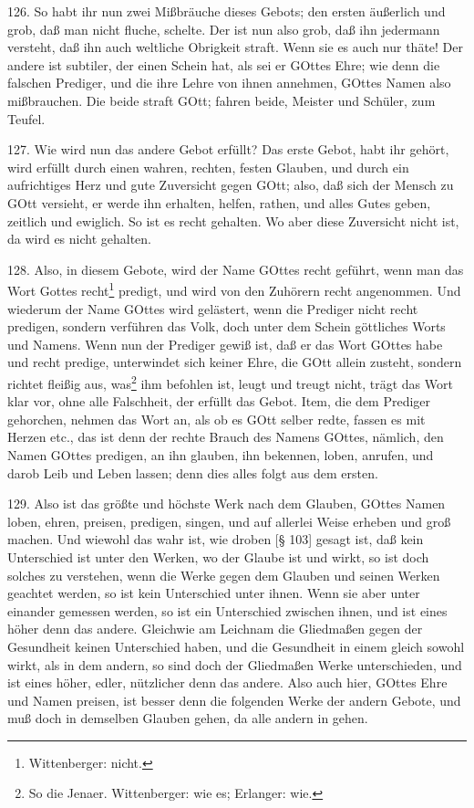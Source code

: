 126. So habt ihr nun zwei Mißbräuche dieses Gebots; den ersten äußerlich und grob, daß man nicht fluche, schelte. Der ist nun also grob, daß ihn jedermann versteht, daß ihn auch weltliche Obrigkeit straft. Wenn sie es auch nur thäte! Der andere ist subtiler, der einen Schein hat, als sei er GOttes Ehre; wie denn die falschen Prediger, und die ihre Lehre von ihnen annehmen, GOttes Namen also mißbrauchen. Die beide straft GOtt; fahren beide, Meister und Schüler, zum Teufel.

127. Wie wird nun das andere Gebot erfüllt? Das erste Gebot, habt ihr gehört, wird erfüllt durch einen wahren, rechten, festen Glauben, und durch ein aufrichtiges Herz und gute Zuversicht gegen GOtt; also, daß sich der Mensch zu GOtt versieht, er werde ihn erhalten, helfen, rathen, und alles Gutes geben, zeitlich und ewiglich. So ist es recht gehalten. Wo aber diese Zuversicht nicht ist, da wird es nicht gehalten.

128. Also, in diesem Gebote, wird der Name GOttes recht geführt, wenn man das Wort Gottes recht\footnote{Wittenberger: nicht.} predigt, und wird von den Zuhörern recht angenommen. Und wiederum der Name GOttes wird gelästert, wenn die Prediger nicht recht predigen, sondern verführen das Volk, doch unter dem Schein göttliches Worts und Namens. Wenn nun der Prediger gewiß ist, daß er das Wort GOttes habe und recht predige, unterwindet sich keiner Ehre, die GOtt allein zusteht, sondern richtet fleißig aus, was\footnote{So die Jenaer. Wittenberger: wie es; Erlanger: wie.} ihm befohlen ist, leugt und treugt nicht, trägt das Wort klar vor, ohne alle Falschheit, der erfüllt das Gebot. Item, die dem Prediger gehorchen, nehmen das Wort an, als ob es GOtt selber redte, fassen es mit Herzen etc., das ist denn der rechte Brauch des Namens GOttes, nämlich, den Namen GOttes predigen, an ihn glauben, ihn bekennen, loben, anrufen, und darob Leib und Leben lassen; denn dies alles folgt aus dem ersten.

129. Also ist das größte und höchste Werk nach dem Glauben, GOttes Namen loben, ehren, preisen, predigen, singen, und auf allerlei Weise erheben und groß machen. Und wiewohl das wahr ist, wie droben [§ 103] gesagt ist, daß kein Unterschied ist unter den Werken, wo der Glaube ist und wirkt, so ist doch solches zu verstehen, wenn die Werke gegen dem Glauben und seinen Werken geachtet werden, so ist kein Unterschied unter ihnen. Wenn sie aber unter einander gemessen werden, so ist ein Unterschied zwischen ihnen, und ist eines höher denn das andere. Gleichwie am Leichnam die Gliedmaßen gegen der Gesundheit keinen Unterschied haben, und die Gesundheit in einem gleich sowohl wirkt, als in dem andern, so sind doch der Gliedmaßen Werke unterschieden, und ist eines höher, edler, nützlicher denn das andere. Also auch hier, GOttes Ehre und Namen preisen, ist besser denn die folgenden Werke der andern Gebote, und muß doch in demselben Glauben gehen, da alle andern in gehen.

